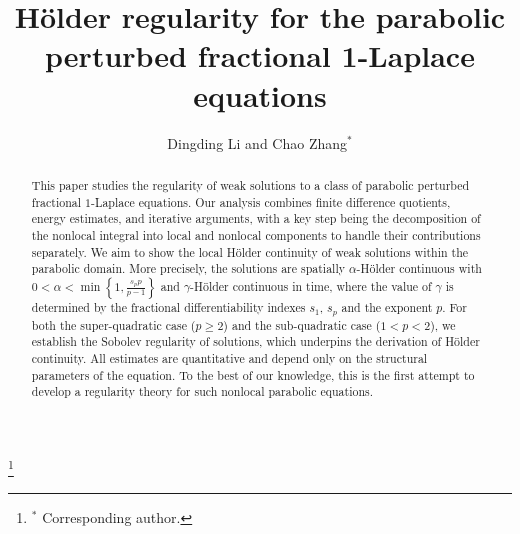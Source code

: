 \documentclass[reqno,10pt]{amsart}
\numberwithin{equation}{section}
\begin{document}
	
	\title[\hfil Regularity for parabolic perturbed fractional 1-Laplacian] {H\"{o}lder regularity for the parabolic perturbed fractional 1-Laplace equations}
	
		\author[D. Li and C. Zhang  \hfil \hfilneg]
		{Dingding Li  and Chao Zhang$^*$}
	
	\thanks{$^*$ Corresponding author.}
	
	\address{Dingding Li \hfill\break
			School of Mathematics, Harbin Institute of Technology, Harbin 150001, China
}
	
	
	\address{Chao Zhang  \hfill\break School of Mathematics and Institute for Advanced Study in Mathematics, Harbin Institute of Technology, Harbin 150001, China}
	
	
	
	\maketitle
	
\begin{abstract}
This paper studies the regularity of weak solutions to a class of parabolic perturbed fractional $1$-Laplace equations. Our analysis combines finite difference quotients, energy estimates, and iterative arguments, with a key step being the decomposition of the nonlocal integral into local and nonlocal components to handle their contributions separately. We aim to show the local H\"{o}lder continuity of weak solutions within the parabolic domain. More precisely, the solutions are spatially $\alpha$-H\"{o}lder continuous with $0<\alpha<\min\left\lbrace1, \frac{s_p p}{p-1} \right\rbrace$ and $\gamma$-H\"{o}lder continuous in time, where  the value of $\gamma$ is determined by the fractional differentiability indexes $s_1$, $s_p$ and the exponent $p$. For both the super-quadratic case ($p\ge 2$) and the sub-quadratic case ($1<p<2$), we establish the Sobolev regularity of solutions, which underpins the derivation of H\"{o}lder continuity. All estimates are quantitative and depend only on the structural parameters of the equation. To the best of our knowledge, this is the first attempt to develop a regularity theory for such nonlocal parabolic equations.
\end{abstract}
\end{document}
